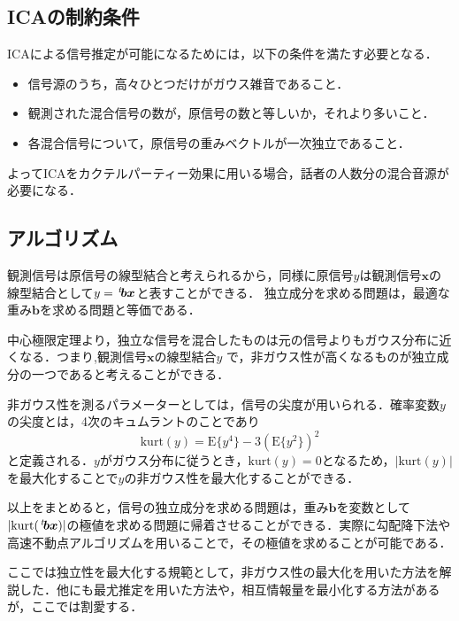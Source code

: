 \documentclass{jarticle}
\begin{document}
\subsection{ICAの制約条件}
ICAによる信号推定が可能になるためには，以下の条件を満たす必要となる．
\begin{itemize}
  \setlength{\parskip}{0cm}
  \setlength{\itemsep}{0cm}
  \item 信号源のうち，高々ひとつだけがガウス雑音であること．
  \item 観測された混合信号の数が，原信号の数と等しいか，それより多いこと．
  \item 各混合信号について，原信号の重みベクトルが一次独立であること．
\end{itemize}\par
よってICAをカクテルパーティー効果に用いる場合，話者の人数分の混合音源が必要になる．

\subsection{アルゴリズム}
観測信号は原信号の線型結合と考えられるから，同様に原信号$y$は観測信号$\bm{x}$の線型結合として$y = \trsps{\bm{b}}\bm{x}$と表すことができる．
独立成分を求める問題は，最適な重み$\bm{b}$を求める問題と等価である．\par
中心極限定理より，独立な信号を混合したものは元の信号よりもガウス分布に近くなる．つまり,観測信号$\bm{x}$の線型結合$y$
で，非ガウス性が高くなるものが独立成分の一つであると考えることができる．\par
非ガウス性を測るパラメーターとしては，信号の尖度が用いられる．確率変数$y$の尖度とは，4次のキュムラントのことであり
\begin{equation}
\mathrm{kurt}(y) = \mathrm{E}\{y^4\}-3(\mathrm{E}\{y^2\})^2\nonumber
\end{equation}
と定義される．$y$がガウス分布に従うとき，$\mathrm{kurt}(y)=0$となるため，$|\mathrm{kurt}(y)|$を最大化することで$y$の非ガウス性を最大化することができる．\par
以上をまとめると，信号の独立成分を求める問題は，重み$\bm{b}$を変数として$|\mathrm{kurt}(\trsps{\bm{b}}\bm{x})|$の極値を求める問題に帰着させることができる．実際に勾配降下法や
高速不動点アルゴリズムを用いることで，その極値を求めることが可能である．\par
ここでは独立性を最大化する規範として，非ガウス性の最大化を用いた方法を解説した．他にも最尤推定を用いた方法や，相互情報量を最小化する方法があるが，ここでは割愛する．
\end{document}
